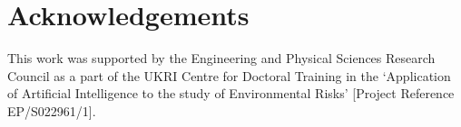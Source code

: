 \section{Acknowledgements}
This work was supported by the Engineering and Physical Sciences Research
Council as a part of the UKRI Centre for Doctoral Training in the `Application
of Artificial Intelligence to the study of Environmental Risks' [Project Reference
EP/S022961/1].